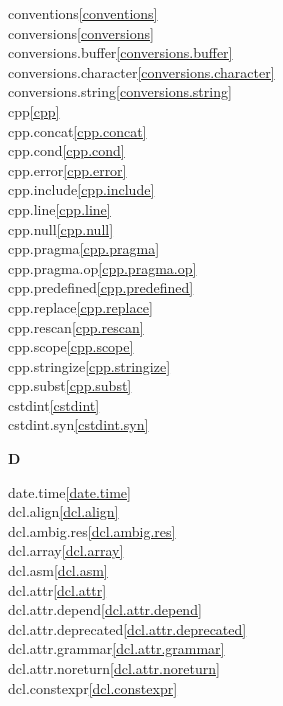 \begin{multicols}{2}
conventions\quad\ref{conventions}\\
conversions\quad\ref{conversions}\\
conversions.buffer\quad\ref{conversions.buffer}\\
conversions.character\quad\ref{conversions.character}\\
conversions.string\quad\ref{conversions.string}\\
cpp\quad\ref{cpp}\\
cpp.concat\quad\ref{cpp.concat}\\
cpp.cond\quad\ref{cpp.cond}\\
cpp.error\quad\ref{cpp.error}\\
cpp.include\quad\ref{cpp.include}\\
cpp.line\quad\ref{cpp.line}\\
cpp.null\quad\ref{cpp.null}\\
cpp.pragma\quad\ref{cpp.pragma}\\
cpp.pragma.op\quad\ref{cpp.pragma.op}\\
cpp.predefined\quad\ref{cpp.predefined}\\
cpp.replace\quad\ref{cpp.replace}\\
cpp.rescan\quad\ref{cpp.rescan}\\
cpp.scope\quad\ref{cpp.scope}\\
cpp.stringize\quad\ref{cpp.stringize}\\
cpp.subst\quad\ref{cpp.subst}\\
cstdint\quad\ref{cstdint}\\
cstdint.syn\quad\ref{cstdint.syn}\\
\par \textbf{D}\par
date.time\quad\ref{date.time}\\
dcl.align\quad\ref{dcl.align}\\
dcl.ambig.res\quad\ref{dcl.ambig.res}\\
dcl.array\quad\ref{dcl.array}\\
dcl.asm\quad\ref{dcl.asm}\\
dcl.attr\quad\ref{dcl.attr}\\
dcl.attr.depend\quad\ref{dcl.attr.depend}\\
dcl.attr.deprecated\quad\ref{dcl.attr.deprecated}\\
dcl.attr.grammar\quad\ref{dcl.attr.grammar}\\
dcl.attr.noreturn\quad\ref{dcl.attr.noreturn}\\
dcl.constexpr\quad\ref{dcl.constexpr}\\

\end{multicols}
